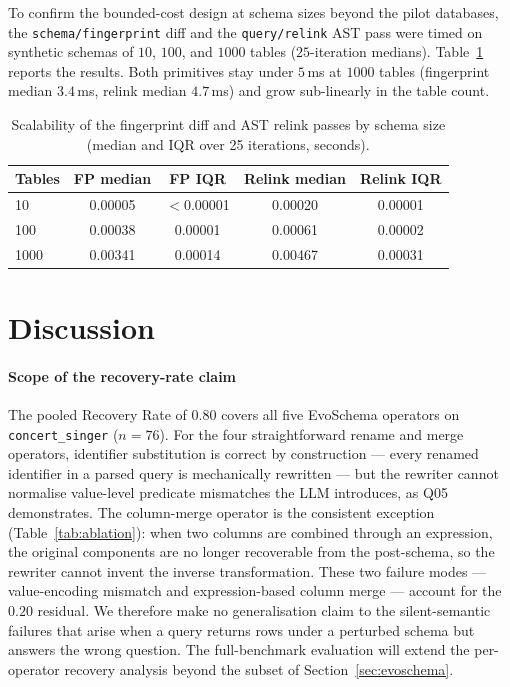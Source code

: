 \documentclass[conference,10pt,a4paper]{IEEEtran}
\begin{document}
To confirm the bounded-cost design at schema sizes beyond the pilot
databases, the \texttt{schema/fingerprint} diff and the \texttt{query/relink}
AST pass were timed on synthetic schemas of $10$, $100$, and $1000$ tables
($25$-iteration medians). Table~\ref{tab:scalability} reports the results.
Both primitives stay under $5$\,ms at $1000$ tables (fingerprint
median $3.4$\,ms, relink median $4.7$\,ms) and grow sub-linearly in
the table count.

\begin{table}[t]
\centering
\caption{Scalability of the fingerprint diff and AST relink passes by schema
size (median and IQR over 25 iterations, seconds).}
\label{tab:scalability}
\begin{tabular}{lcccc}
\toprule
\textbf{Tables} & \textbf{FP median} & \textbf{FP IQR} & \textbf{Relink median} & \textbf{Relink IQR} \\
\midrule
10   & 0.00005 & $<$0.00001 & 0.00020 & 0.00001 \\
100  & 0.00038 & 0.00001 & 0.00061 & 0.00002 \\
1000 & 0.00341 & 0.00014 & 0.00467 & 0.00031 \\
\bottomrule
\end{tabular}
\end{table}

\section{Discussion}

\paragraph*{Scope of the recovery-rate claim}
The pooled Recovery Rate of $0.80$ covers all five EvoSchema
operators on \texttt{concert\_singer} ($n = 76$). For the four straightforward rename
and merge operators, identifier substitution is correct by construction
--- every renamed identifier in a parsed query is mechanically
rewritten --- but the rewriter cannot normalise value-level predicate
mismatches the LLM introduces, as Q05 demonstrates. The column-merge
operator is the consistent exception (Table~\ref{tab:ablation}): when
two columns are combined through an expression, the original components
are no longer recoverable from the post-schema, so the rewriter cannot
invent the inverse transformation. These two failure modes ---
value-encoding mismatch and expression-based column merge ---
account for the $0.20$ residual. We therefore make no generalisation
claim to the silent-semantic failures that arise when a query returns
rows under a perturbed schema but answers the wrong question. The full-benchmark evaluation will extend the per-operator recovery
analysis beyond the subset of Section~\ref{sec:evoschema}.
\end{document}
